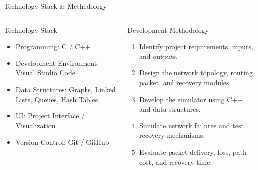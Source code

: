 \documentclass[aspectratio=169,11pt]{beamer}
\begin{document}
\begin{frame}{Technology Stack \& Methodology}

\begin{columns}[T,onlytextwidth]


\begin{block}{Technology Stack}
\footnotesize

\begin{itemize}
\setlength{\itemsep}{1pt}

  \item Programming: C / C++
  \item Development Environment: Visual Studio Code
  \item Data Structures: Graphs, Linked Lists, Queues, Hash Tables
  \item UI: Project Interface / Visualization
  \item Version Control: Git / GitHub

\end{itemize}
\end{block}



\begin{block}{Development Methodology}
\footnotesize

\begin{enumerate}
\setlength{\itemsep}{1pt}

  \item Identify project requirements, inputs, and outputs.
  
  \item Design the network topology, routing, packet, and recovery modules.
  
  \item Develop the simulator using C++ and data structures.
  
  \item Simulate network failures and test recovery mechanisms.
  
  \item Evaluate packet delivery, loss, path cost, and recovery time.

\end{enumerate}
\end{block}

\end{columns}

\vspace{1mm}

\begin{center}
\scriptsize

\end{center}

\end{frame}
\end{document}
